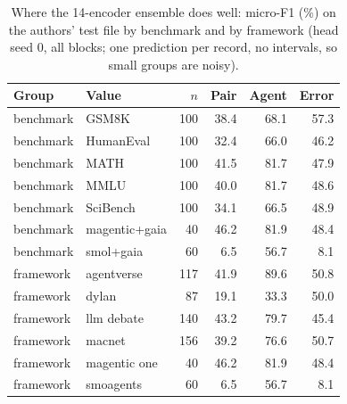 \begin{table}[t]
\caption{Where the 14-encoder ensemble does well: micro-F1 (\%) on the authors' test file by benchmark and by framework (head seed 0, all blocks; one prediction per record, no intervals, so small groups are noisy).}
\label{tab:breakdown}
\centering\footnotesize\setlength{\tabcolsep}{3pt}
\begin{tabular}{@{}llrrrr@{}}
\toprule
Group & Value & $n$ & Pair & Agent & Error \\
\midrule
benchmark & GSM8K & 100 & 38.4 & 68.1 & 57.3 \\
benchmark & HumanEval & 100 & 32.4 & 66.0 & 46.2 \\
benchmark & MATH & 100 & 41.5 & 81.7 & 47.9 \\
benchmark & MMLU & 100 & 40.0 & 81.7 & 48.6 \\
benchmark & SciBench & 100 & 34.1 & 66.5 & 48.9 \\
benchmark & magentic+gaia & 40 & 46.2 & 81.9 & 48.4 \\
benchmark & smol+gaia & 60 & 6.5 & 56.7 & 8.1 \\
framework & agentverse & 117 & 41.9 & 89.6 & 50.8 \\
framework & dylan & 87 & 19.1 & 33.3 & 50.0 \\
framework & llm debate & 140 & 43.2 & 79.7 & 45.4 \\
framework & macnet & 156 & 39.2 & 76.6 & 50.7 \\
framework & magentic one & 40 & 46.2 & 81.9 & 48.4 \\
framework & smoagents & 60 & 6.5 & 56.7 & 8.1 \\
\bottomrule
\end{tabular}
\end{table}
